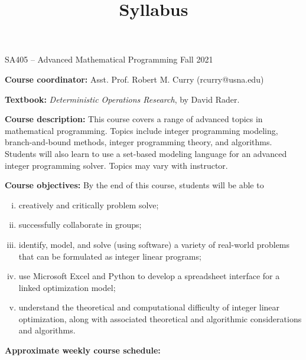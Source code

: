 \documentclass[12pt]{article}
\makeatletter
\theoremstyle{definition}
\newcommand{\graphbox}[5]%
{
\begin{tikzpicture}
     [>=latex,scale=#5]
     
     \draw [->,very thick] (#1, 0) -- (#2, 0) node[right] {$x$};
     \draw [->,very thick] (0, #3) -- (0, #4) node[above] {$y$};
     
     \draw[step=1cm,thick,dotted] (#1,#3) grid (#2,#4);
   \end{tikzpicture}
   }
\renewcommand{\maketitle}{
  \noindent SA405 -- Advanced Mathematical Programming \hfill Fall 2021

  \begin{center}\large{\textbf{\@title}}\end{center}
}
\makeatother
\begin{document}

\title{Syllabus}


\maketitle

\noindent \textbf{Course coordinator:}  Asst. Prof. Robert M. Curry  (rcurry@usna.edu)

\noindent \textbf{Textbook:}  \emph{Deterministic Operations Research}, by David Rader.

\noindent \textbf{Course description: }This course covers a range of advanced topics in mathematical programming. Topics include integer programming modeling, branch-and-bound methods, integer programming theory,  and algorithms. Students will also learn to use a set-based modeling language for an advanced integer programming solver. Topics may vary with instructor.

\noindent \textbf{Course objectives:}  By the end of this course, students will be able to
\vspace{-2mm}
\begin{enumerate}[(i)]
\item creatively and critically problem solve;
\item successfully collaborate in groups;
\item identify, model, and solve (using software) a variety of real-world problems that can be formulated as integer linear programs;
\item use Microsoft Excel and Python to develop a spreadsheet interface for a linked optimization model;
\item understand the theoretical and computational difficulty of integer linear optimization, along with associated theoretical and algorithmic considerations and algorithms.
\end{enumerate}
\noindent \textbf{Approximate weekly course schedule:} 
\end{document}
